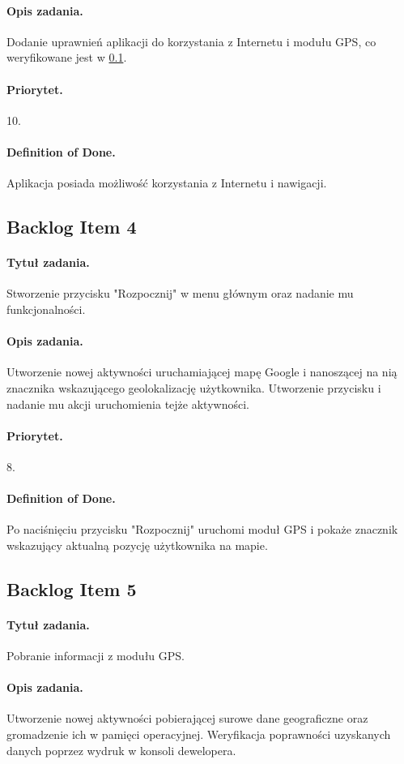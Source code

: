 \documentclass[a4paper]{article}
\begin{document}
\paragraph{Opis zadania.} Dodanie uprawnień aplikacji do korzystania z Internetu i modułu GPS, co weryfikowane jest w \ref{bl4}.
\paragraph{Priorytet.} 10.
\paragraph{Definition of Done.} Aplikacja posiada możliwość korzystania z Internetu i nawigacji.

\subsection{Backlog Item 4}
\label{bl4}
\paragraph{Tytuł zadania.} Stworzenie przycisku "Rozpocznij" w menu głównym oraz nadanie mu funkcjonalności.
\paragraph{Opis zadania.} Utworzenie nowej aktywności uruchamiającej mapę Google i nanoszącej na nią znacznika wskazującego geolokalizację użytkownika. Utworzenie przycisku i nadanie mu akcji uruchomienia tejże aktywności.
\paragraph{Priorytet.} 8.
\paragraph{Definition of Done.} Po naciśnięciu przycisku "Rozpocznij" uruchomi moduł GPS i pokaże znacznik wskazujący aktualną pozycję użytkownika na mapie.

\subsection{Backlog Item 5}
\paragraph{Tytuł zadania.} Pobranie informacji z modułu GPS.
\paragraph{Opis zadania.} Utworzenie nowej aktywności pobierającej surowe dane geograficzne oraz gromadzenie ich w pamięci operacyjnej. Weryfikacja poprawności uzyskanych danych poprzez wydruk w konsoli dewelopera.
\end{document}
